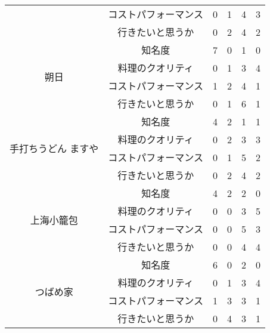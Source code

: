 \begin{table}[H]
\begin{tabular}{|c|c|r|r|r|r|}
 & コストパフォーマンス & 0 & 1 & 4 & 3 \\ \cline{2-6}
 & 行きたいと思うか & 0 & 2 & 4 & 2 \\ \hline
\multirow{4}{*}{朔日} & 知名度 & 7 & 0 & 1 & 0 \\ \cline{2-6}
 & 料理のクオリティ & 0 & 1 & 3 & 4 \\ \cline{2-6}
 & コストパフォーマンス & 1 & 2 & 4 & 1 \\ \cline{2-6}
 & 行きたいと思うか & 0 & 1 & 6 & 1 \\ \hline
\multirow{4}{*}{手打ちうどん ますや} & 知名度 & 4 & 2 & 1 & 1 \\ \cline{2-6}
 & 料理のクオリティ & 0 & 2 & 3 & 3 \\ \cline{2-6}
 & コストパフォーマンス & 0 & 1 & 5 & 2 \\ \cline{2-6}
 & 行きたいと思うか & 0 & 2 & 4 & 2 \\ \hline
\multirow{4}{*}{上海小籠包} & 知名度 & 4 & 2 & 2 & 0 \\ \cline{2-6}
 & 料理のクオリティ & 0 & 0 & 3 & 5 \\ \cline{2-6}
 & コストパフォーマンス & 0 & 0 & 5 & 3 \\ \cline{2-6}
 & 行きたいと思うか & 0 & 0 & 4 & 4 \\ \hline
\multirow{4}{*}{つばめ家} & 知名度 & 6 & 0 & 2 & 0 \\ \cline{2-6}
 & 料理のクオリティ & 0 & 1 & 3 & 4 \\ \cline{2-6}
 & コストパフォーマンス & 1 & 3 & 3 & 1 \\ \cline{2-6}
 & 行きたいと思うか & 0 & 4 & 3 & 1 \\ \hline
\end{tabular}
\end{table}
